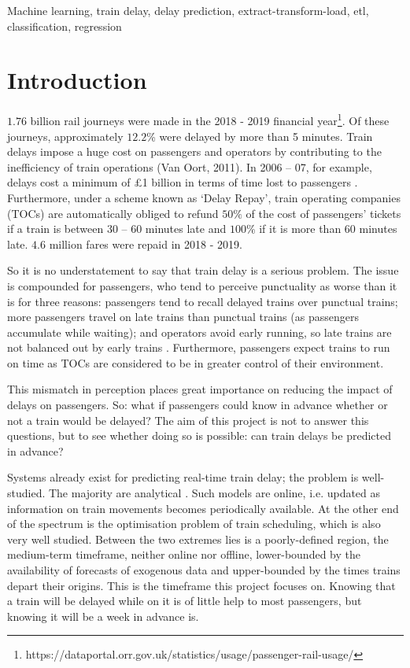 \documentclass[12pt,a4paper]{article}
\begin{document}
\begin{keywords}
Machine learning, train delay, delay prediction, extract-transform-load, etl, classification, regression
\end{keywords}

\clearpage
\section{Introduction}
\label{section:introduction}

$1.76$ billion rail journeys were made in the 2018 - 2019 financial year\footnote{https://dataportal.orr.gov.uk/statistics/usage/passenger-rail-usage/}. Of these journeys, approximately $12.2$\% were delayed by more than 5 minutes. Train delays impose a huge cost on passengers and operators by contributing to the inefficiency of train operations (Van Oort, 2011). In 2006 – 07, for example, delays cost a minimum of £1 billion in terms of time lost to passengers \cite{nao_2008}. Furthermore, under a scheme known as ‘Delay Repay’, train operating companies (TOCs) are automatically obliged to refund $50\%$ of the cost of passengers’ tickets if a train is between 30 – 60 minutes late and $100\%$ if it is more than 60 minutes late. $4.6$ million fares were repaid in 2018 - 2019.

So it is no understatement to say that train delay is a serious problem. The issue is compounded for passengers, who tend to perceive punctuality as worse than it is for three reasons: passengers tend to recall delayed trains over punctual trains; more passengers travel on late trains than punctual trains (as passengers accumulate while waiting); and operators avoid early running, so late trains are not balanced out by early trains \cite[p.~130]{harris_godward_1992}. Furthermore, passengers expect trains to run on time as TOCs are considered to be in greater control of their environment.

This mismatch in perception places great importance on reducing the impact of delays on passengers. So: what if passengers could know in advance whether or not a train would be delayed? The aim of this project is not to answer this questions, but to see whether doing so is possible: can train delays be predicted in advance? 

Systems already exist for predicting real-time train delay; the problem is well-studied. The majority are analytical \cite{oneto_et_al_2016}. Such models are online, i.e. updated as information on train movements becomes periodically available. At the other end of the spectrum is the optimisation problem of train scheduling, which is also very well studied. Between the two extremes lies is a poorly-defined region, the medium-term timeframe, neither online nor offline, lower-bounded by the availability of forecasts of exogenous data and upper-bounded by the times trains depart their origins. This is the timeframe this project focuses on. Knowing that a train will be delayed while on it is of little help to most passengers, but knowing it will be a week in advance is. 
\end{document}
